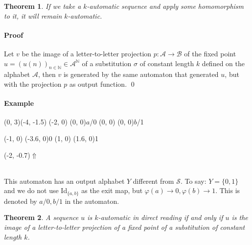 \documentclass{article}
\begin{document}
\newtheorem{automata}{Theorem} \begin{automata} 
If we take a $k$-automatic sequence and apply some homomorphism to it, it will 
remain $k$-automatic.
\end{automata}

\paragraph{Proof} Let $v$ be the image of a letter-to-letter
projection $p: \mathcal{A} \rightarrow \mathcal{B}$ of the fixed point
$u = (u(n))_{n \in \mathbb{N}} \in \mathcal{A}^\mathbb{N}$ of a substitution
$\sigma$ of constant length $k$ defined on the alphabet $\mathcal{A}$, then
$v$ is generated by the same automaton that generated $u$, but with the
projection $p$ as output function. \qed

\paragraph{Example\\}
\begin{graph}(0, 3)(-4, -1.5)
  (-2, 0) (0, 0){$a$/0}
  (0, 0)  (0, 0){$b$/1}

  (-1, 0) \freetext(-3.6, 0){0}
   
   
  (1, 0) \freetext(1.6, 0){1}

  \freetext(-2, -0.7){$\Uparrow$}
\end{graph}\\
This automaton has an output alphabet $Y$ different from $\mathcal{S}$. To
say: $Y = \{0, 1\}$ and we do not use Id$_{\{a, b\}}$ as the exit map, but
$\varphi(a) \rightarrow 0, \varphi(b) \rightarrow 1$. This is denoted by
$a/0, b/1$ in the automaton.

\begin{automata} \label{directreading}
A sequence $u$ is $k$-automatic in direct reading if and only if $u$ is the 
image of a letter-to-letter projection of a fixed point of a substitution of 
constant length $k$.
\end{automata}
\end{document}
